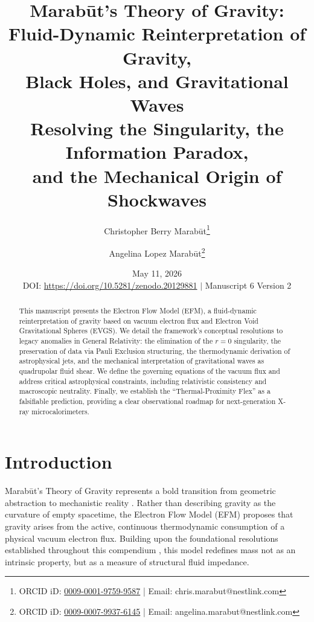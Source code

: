 \documentclass[11pt, a4paper]{article}
\title{\textbf{Marab\={u}t's Theory of Gravity: \\ Fluid-Dynamic Reinterpretation of Gravity, \\ Black Holes, and Gravitational Waves} \\[1em] \large{Resolving the Singularity, the Information Paradox, \\ and the Mechanical Origin of Shockwaves}}
\author[1]{Christopher Berry Marab\={u}t\thanks{ORCID iD: \href{https://orcid.org/0009-0001-9759-9587}{0009-0001-9759-9587} | Email: chris.marabut@nestlink.com}}
\author[1]{Angelina Lopez Marab\={u}t\thanks{ORCID iD: \href{https://orcid.org/0009-0007-9937-6145}{0009-0007-9937-6145} | Email: angelina.marabut@nestlink.com}}
\affil[1]{Independent Researchers}
\date{May 11, 2026 \\[1.5em] \small{DOI: \url{https://doi.org/10.5281/zenodo.20129881} $|$ Manuscript 6 Version 2}}
\begin{document}

\maketitle

\begin{abstract}
  This manuscript presents the Electron Flow Model (EFM), a fluid-dynamic reinterpretation of gravity based on vacuum electron flux and Electron Void Gravitational Spheres (EVGS). We detail the framework's conceptual resolutions to legacy anomalies in General Relativity: the elimination of the $r=0$ singularity, the preservation of data via Pauli Exclusion structuring, the thermodynamic derivation of astrophysical jets, and the mechanical interpretation of gravitational waves as quadrupolar fluid shear. We define the governing equations of the vacuum flux and address critical astrophysical constraints, including relativistic consistency and macroscopic neutrality. Finally, we establish the ``Thermal-Proximity Flex'' as a falsifiable prediction, providing a clear observational roadmap for next-generation X-ray microcalorimeters.
\end{abstract}

\section{Introduction}
Marab\={u}t's Theory of Gravity represents a bold transition from geometric abstraction to mechanistic reality \cite{marabut2026m1}. Rather than describing gravity as the curvature of empty spacetime, the Electron Flow Model (EFM) proposes that gravity arises from the active, continuous thermodynamic consumption of a physical vacuum electron flux. Building upon the foundational resolutions established throughout this compendium \cite{marabut2026m1, marabut2026m2, marabut2026m3, marabut2026m4, marabut2026m5}, this model redefines mass not as an intrinsic property, but as a measure of structural fluid impedance.
\end{document}
